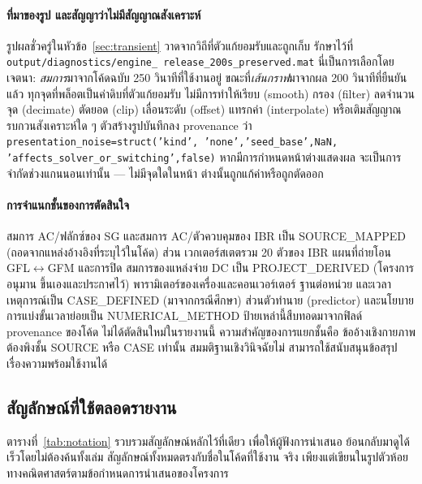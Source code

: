 \documentclass[12pt,a4paper]{article}
\begin{document}
\paragraph{ที่มาของรูป และสัญญาว่าไม่มีสัญญาณสังเคราะห์}
\begin{sloppypar}
รูปผลชั่วครู่ในหัวข้อ~\ref{sec:transient} วาดจากวิถีที่ตัวแก้ยอมรับและถูกเก็บ
รักษาไว้ที่ \texttt{output/\allowbreak diagnostics/\allowbreak engine\_\allowbreak
release\_\allowbreak 200s\_\allowbreak preserved.mat} นี่เป็นการเลือกโดยเจตนา:
\emph{สมการ}มาจากโค้ดฉบับ 250 วินาทีที่ใช้งานอยู่ ขณะที่\emph{เส้นกราฟ}มาจากผล
200 วินาทีที่ยืนยันแล้ว ทุกจุดที่พล็อตเป็นค่าดิบที่ตัวแก้ยอมรับ ไม่มีการทำให้เรียบ
(smooth) กรอง (filter) ลดจำนวนจุด (decimate) ตัดยอด (clip) เลื่อนระดับ (offset)
แทรกค่า (interpolate) หรือเติมสัญญาณรบกวนสังเคราะห์ใด ๆ ตัวสร้างรูปบันทึกลง
provenance ว่า \texttt{presentation\_\allowbreak noise=struct('kind',\allowbreak
'none',\allowbreak 'seed\_\allowbreak base',NaN,\allowbreak
'affects\_\allowbreak solver\_\allowbreak or\_\allowbreak switching',false)}
หากมีการกำหนดหน้าต่างแสดงผล จะเป็นการจำกัดช่วงแกนนอนเท่านั้น --- ไม่มีจุดใดในหน้า
ต่างนั้นถูกแก้ค่าหรือถูกตัดออก
\end{sloppypar}

\paragraph{การจำแนกชั้นของการตัดสินใจ}
\begin{sloppypar}
สมการ AC/ฟลักซ์ของ SG และสมการ AC/ตัวควบคุมของ IBR เป็น
\textsf{SOURCE\_\allowbreak MAPPED} (ถอดจากแหล่งอ้างอิงที่ระบุไว้ในโค้ด) ส่วน
เวกเตอร์สเตตรวม 20 ตัวของ IBR แผนที่ถ่ายโอน GFL$\leftrightarrow$GFM และการปิด
สมการของแหล่งจ่าย DC เป็น \textsf{PROJECT\_\allowbreak DERIVED} (โครงการอนุมาน
ขึ้นเองและประกาศไว้) พารามิเตอร์ของเครื่องและคอนเวอร์เตอร์ ฐานต่อหน่วย และเวลา
เหตุการณ์เป็น \textsf{CASE\_\allowbreak DEFINED} (มาจากกรณีศึกษา) ส่วนตัวทำนาย
(predictor) และนโยบายการแบ่งขั้นเวลาย่อยเป็น
\textsf{NUMERICAL\_\allowbreak METHOD} ป้ายเหล่านี้สืบทอดมาจากฟิลด์ provenance
ของโค้ด ไม่ได้ตัดสินใหม่ในรายงานนี้ ความสำคัญของการแยกชั้นคือ ข้ออ้างเชิงกายภาพ
ต้องพิงชั้น \textsf{SOURCE} หรือ \textsf{CASE} เท่านั้น สมมติฐานเชิงวินิจฉัยไม่
สามารถใช้สนับสนุนข้อสรุปเรื่องความพร้อมใช้งานได้
\end{sloppypar}
\newpage
\subsection{สัญลักษณ์ที่ใช้ตลอดรายงาน}\label{sec:notation}
ตารางที่~\ref{tab:notation} รวบรวมสัญลักษณ์หลักไว้ที่เดียว เพื่อให้ผู้ฟังการนำเสนอ
ย้อนกลับมาดูได้เร็วโดยไม่ต้องค้นทั้งเล่ม สัญลักษณ์ทั้งหมดตรงกับชื่อในโค้ดที่ใช้งาน
จริง เพียงแต่เขียนในรูปตัวห้อยทางคณิตศาสตร์ตามข้อกำหนดการนำเสนอของโครงการ
\end{document}
